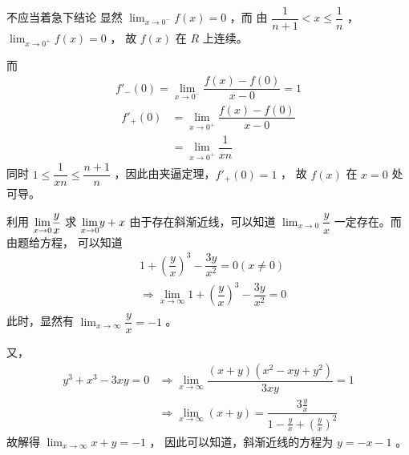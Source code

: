 \begin{answer}[C2T8]{不应当着急下结论}
    显然 $ {\displaystyle\lim_{x\rightarrow 0^-}}f(x) = 0 $ ，而
    由 $ \dfrac{1}{n+1} < x \leq \dfrac{1}{n} $ ， $ {\displaystyle\lim_{x\rightarrow 0^+}}f(x)=0 $ ，
    故 $ f(x) $ 在 $ R $ 上连续。
    
    而\begin{equation*}
        \begin{aligned}
            f'_-(0) = {\displaystyle\lim_{x\rightarrow 0^-}}\dfrac{f(x)-f(0)}{x-0} = 1
        \end{aligned}
    \end{equation*}
    \begin{equation*}
        \begin{aligned}
            f'_+(0) &= {\displaystyle\lim_{x\rightarrow 0^+}}
            \dfrac{f(x)-f(0)}{x - 0} \\&= {\displaystyle\lim_{x\rightarrow 0^+}}
            \dfrac{1}{xn}
        \end{aligned}
    \end{equation*}
    同时 $ 1\leq \dfrac{1}{xn} \leq \dfrac{n+1}{n} $ ，因此由夹逼定理，$ f'_+(0) = 1 $ ，
    故 $ f(x) $ 在 $ x=0 $ 处可导。
\end{answer}

\begin{answer}[C2T11]{利用 $ {\displaystyle\lim_{x\rightarrow 0}}\dfrac{y}{x} $ 求 $ {\displaystyle\lim_{x\rightarrow 0}}y+x $ }
    由于存在斜渐近线，可以知道 $ {\displaystyle\lim_{x\rightarrow 0}}\dfrac{y}{x} $ 一定存在。而由题给方程，
    可以知道\begin{equation*}
        \begin{aligned}
            &1+(\dfrac{y}{x})^3 - \dfrac{3y}{x^2} = 0 (x\neq 0)\\ &\Rightarrow
            {\displaystyle\lim_{x\rightarrow \infty}}1+(\dfrac{y}{x})^3 - \dfrac{3y}{x^2} = 0 \\
        \end{aligned}
    \end{equation*}
    此时，显然有 $ {\displaystyle\lim_{x\rightarrow \infty}}\dfrac{y}{x} = -1 $ 。

    又，\begin{equation*}
        \begin{aligned}
            y^3+x^3-3xy = 0&\Rightarrow {\displaystyle\lim_{x\rightarrow \infty}}
            \dfrac{(x+y)(x^2 - xy + y^2)}{3xy} = 1 \\ &\Rightarrow
            {\displaystyle\lim_{x\rightarrow \infty}}(x+y) = 
            \dfrac{3\frac{y}{x}}{1 - \frac{y}{x} + (\frac{y}{x})^2}            
        \end{aligned}
    \end{equation*}
    故解得 $ {\displaystyle\lim_{x\rightarrow \infty}}x+y = -1 $ ，
    因此可以知道，斜渐近线的方程为 $ y = -x-1 $ 。
\end{answer}

